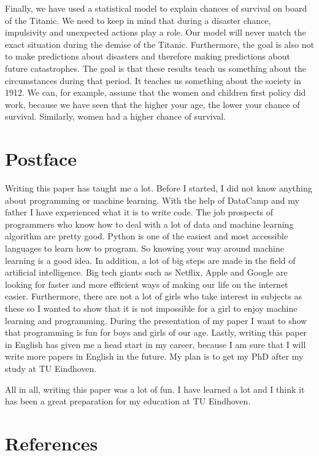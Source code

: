 \documentclass[11pt]{article}
\begin{document}
Finally, we have used a statistical model to explain chances of survival on board of the Titanic. We need to keep in mind that during a disaster chance, impulsivity and unexpected actions play a role. Our model will never match the exact situation during the demise of the Titanic. Furthermore, the goal is also not to make predictions about disasters and therefore making predictions about future catastrophes. The goal is that these results teach us something about the circumstances during that period. It teaches us something about the society in 1912. We can, for example, assume that the women and children first policy did work, because we have seen that the higher your age, the lower your chance of survival. Similarly, women had a higher chance of survival. 


\newpage
\section{Postface}
\label{sec:org6350f49}

Writing this paper has taught me a lot. Before I started, I did not know anything about programming or machine learning. With the help of DataCamp and my father I have experienced what it is to write code. The job prospects of programmers who know how to deal with a lot of data and machine learning algorithm are pretty good. Python is one of the easiest and most accessible languages to learn how to program. So knowing your way around machine learning is a good idea. In addition, a lot of big steps are made in the field of artificial intelligence.  Big tech giants such as Netflix, Apple and Google are looking for faster and more efficient ways of making our life on the internet easier.  Furthermore, there are not a lot of girls who take interest in subjects as these so I wanted to show that it is not impossible for a girl to enjoy machine learning and programming. During the presentation of my paper I want to show that programming is fun for boys and girls of our age. Lastly, writing this paper in English has given me a head start in my career, because I am sure that I will write more papers in English in the future. My plan is to get my PhD after my study at TU Eindhoven. 

All in all, writing this paper was a lot of fun. I have learned a lot and I think it has been a great preparation for my education at TU Eindhoven. 


\section{References}
\label{sec:org821cf34}
\end{document}
